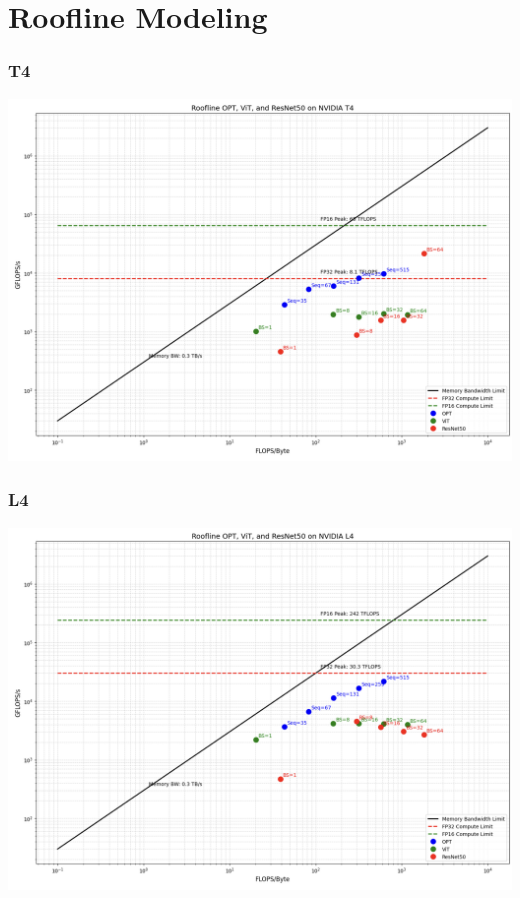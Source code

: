 \documentclass[11pt]{article}
\begin{document}
\section*{Roofline Modeling}
\subsubsection*{T4}
\includegraphics[width=14cm]{roofline/t4_roofline.png}
\subsubsection*{L4}
\includegraphics[width=14cm]{roofline/l4_roofline.png}
\end{document}
